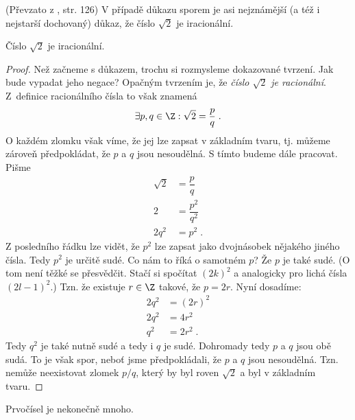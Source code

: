 (Převzato z \cite{ChartrandPolimeniZhang2014}, str. 126)
V případě důkazu sporem je asi nejznámější (a též i nejstarší dochovaný) důkaz, že číslo $\sqrt{2}$ je iracionální.
\begin{assertion}
    Číslo $\sqrt{2}$ je iracionální.
\end{assertion}
\begin{proof}
    Než začneme s důkazem, trochu si rozmysleme dokazované tvrzení. Jak bude vypadat jeho negace? Opačným tvrzením je, že \emph{číslo $\sqrt{2}$ je racionální}. Z~definice racionálního čísla to však znamená
    \begin{equation*}
        \exists p,q\in\Z : \sqrt{2}=\dfrac{p}{q}\; .
    \end{equation*}
    O každém zlomku však víme, že jej lze zapsat v základním tvaru, tj. můžeme zároveň předpokládat, že $p$ a $q$ jsou nesoudělná. S tímto budeme dále pracovat. Pišme
    \begin{align*}
        \sqrt{2}&=\dfrac{p}{q}\\
        2&=\dfrac{p^2}{q^2}\\
        2q^2&=p^2\; .
    \end{align*}
    Z posledního řádku lze vidět, že $p^2$ lze zapsat jako dvojnásobek nějakého jiného čísla. Tedy $p^2$ je určitě sudé. Co nám to říká o samotném $p$? Že $p$ je také sudé. (O tom není těžké se přesvědčit. Stačí si spočítat $(2k)^2$ a analogicky pro lichá čísla $(2l-1)^2$.) Tzn. že existuje $r\in\Z$ takové, že $p=2r$. Nyní dosadíme:
    \begin{align*}
        2q^2&=(2r)^2\\
        2q^2&=4r^2\\
        q^2&=2r^2\; .
    \end{align*}
    Tedy $q^2$ je také nutně sudé a tedy i $q$ je sudé. Dohromady tedy $p$ a $q$ jsou obě sudá. To je však spor, neboť jsme předpokládali, že $p$ a $q$ jsou nesoudělná. Tzn. nemůže neexistovat zlomek $p/q$, který by byl roven $\sqrt{2}$ a byl v základním tvaru.
\end{proof}
\begin{assertion}
    Prvočísel je nekonečně mnoho.
\end{assertion}

